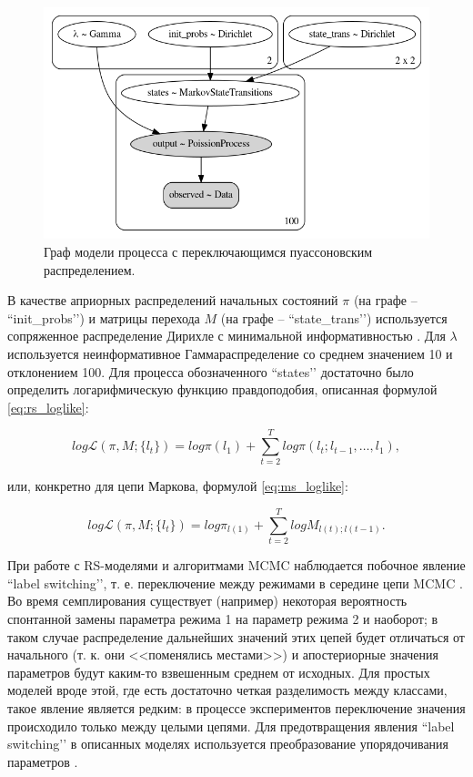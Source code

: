 \documentclass[a4paper,14pt]{extreport}
\begin{document}
\begin{figure}[H]
	\includegraphics[width=\linewidth]{img/gen/pp_ms_pois_graph.png}
	\caption{Граф модели процесса с переключающимся пуассоновским распределением. }
	\label{fig:pp_ms_pois_graph}
\end{figure}

В качестве априорных распределений начальных состояний $\pi$ (на графе -- ``init\_probs’’) и матрицы перехода $M$ (на графе -- ``state\_trans’’) используется сопряженное распределение Дирихле с минимальной информативностью \cite{stan_user_guide}. Для $\lambda$ используется неинформативное Гамма\-распределение со среднем значением 10 и отклонением 100. Для процесса обозначенного ``states’’ достаточно было определить логарифмическую функцию правдоподобия, описанная формулой \eqref{eq:rs_loglike}:

\begin{equation}
	\mathit{log}\mathcal{L}(\pi, M; \{l_t\})
	=
	\mathit{log}\pi(l_1) + 
	\sum\limits_{t=2}^{T}{ 
	\mathit{log}\pi(l_t; l_{t-1}, \dots, l_1)
	} ,
	\label{eq:rs_loglike}
\end{equation}

\noindent
или, конкретно для цепи Маркова, формулой \eqref{eq:ms_loglike}:

\begin{equation}
	\mathit{log}\mathcal{L}(\pi, M; \{l_t\})
	=
	\mathit{log} \pi_{l(1)} + 
	\sum\limits_{t=2}^{T}{ 
	\mathit{log} M_{l(t); l(t-1)}
	} .
	\label{eq:ms_loglike}
\end{equation}

При работе с RS-моделями и алгоритмами MCMC наблюдается побочное явление ``label switching’’, т. е. переключение между режимами в середине цепи MCMC \cite{stan_user_guide,blog_hidden_markov_ravinutala}. Во время семплирования существует (например) некоторая вероятность спонтанной замены параметра режима 1 на параметр режима 2 и наоборот; в таком случае распределение дальнейших значений этих цепей будет отличаться от начального (т. к. они <<поменялись местами>>) и апостериорные значения параметров будут каким-то взвешенным среднем от исходных. Для простых моделей вроде этой, где есть достаточно четкая разделимость между классами, такое явление является редким: в процессе экспериментов переключение значения происходило только между целыми цепями. Для предотвращения явления ``label switching’’ в описанных моделях используется преобразование упорядочивания параметров \cite{blog_hidden_markov_ravinutala}.
\end{document}
